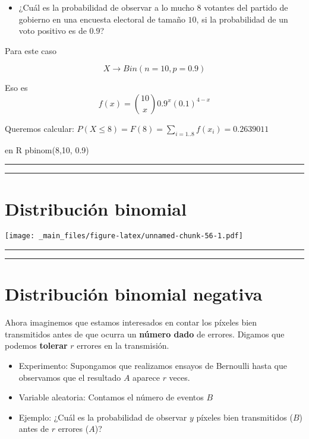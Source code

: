 \documentclass[
]{book}
\providecommand{\tightlist}{%
  \setlength{\itemsep}{0pt}\setlength{\parskip}{0pt}}
\begin{document}
\begin{itemize}
\tightlist
\item
  ¿Cuál es la probabilidad de observar a lo mucho \(8\) votantes del partido de gobierno en una encuesta electoral de tamaño \(10\), si la probabilidad de un voto positivo es de \(0.9\)?
\end{itemize}

Para este caso

\[X \rightarrow Bin(n=10, p=0.9)\]

Eso es \[f(x)=\binom {10} x 0.9^x(0.1)^{4-x}\]

Queremos calcular:
\(P(X\le 8)=F(8)= \sum_{i=1..8} f(x_i)=0.2639011\)

en R pbinom(8,10, 0.9)

\begin{center}\rule{0.5\linewidth}{0.5pt}\end{center}

\begin{center}\rule{0.5\linewidth}{0.5pt}\end{center}

\hypertarget{distribuciuxf3n-binomial-3}{%
\section{Distribución binomial}\label{distribuciuxf3n-binomial-3}}

\texttt{[image: \_main\_files/figure-latex/unnamed-chunk-56-1.pdf]}

\begin{center}\rule{0.5\linewidth}{0.5pt}\end{center}

\begin{center}\rule{0.5\linewidth}{0.5pt}\end{center}

\hypertarget{distribuciuxf3n-binomial-negativa}{%
\section{Distribución binomial negativa}\label{distribuciuxf3n-binomial-negativa}}

Ahora imaginemos que estamos interesados en contar los píxeles bien transmitidos antes de que ocurra un \textbf{número dado} de errores. Digamos que podemos \textbf{tolerar} \(r\) errores en la transmisión.

\begin{itemize}
\item
  Experimento: Supongamos que realizamos ensayos de Bernoulli hasta que observamos que el resultado \(A\) aparece \(r\) veces.
\item
  Variable aleatoria: Contamos el número de eventos \(B\)
\item
  Ejemplo: ¿Cuál es la probabilidad de observar \(y\) píxeles bien transmitidos (\(B\)) antes de \(r\) errores (\(A\))?
\end{itemize}
\end{document}
